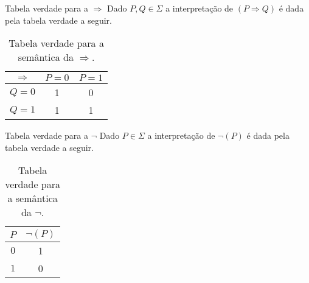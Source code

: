 \documentclass[aspectratio=169]{beamer}
\begin{document}
	\begin{frame}{Tabela verdade para a $\Rightarrow$}
		Dado $P, Q \in \Sigma$ a interpretação de $(P \Rightarrow Q)$ é dada pela tabela verdade a seguir.
		\begin{table}[h]
			\centering
			\begin{tabular}{c|c|c}
				\hline
				$\Rightarrow$ & $P = 0$ & $P = 1$ \\
				\hline
				$Q = 0$ & 1 &  0\\ 
				$Q = 1$ & 1 &  1\\
				\hline
			\end{tabular}
			\caption{Tabela verdade para a semântica da $\Rightarrow$.}
			\label{tab:Implicacao}
		\end{table}
	\end{frame}

	\begin{frame}{Tabela verdade para a $\neg$}
		Dado $P \in \Sigma$ a interpretação de $\neg (P)$ é dada pela tabela verdade a seguir.
		\begin{table}[h]
			\centering
			\begin{tabular}{c|c}
				\hline
				$P$ & $\neg (P)$\\
				\hline
				$0$ & 1\\ 
				$1$ &  0\\
				\hline
			\end{tabular}
			\caption{Tabela verdade para a semântica da $\neg$.}
			\label{tab:negacao}
		\end{table}
	\end{frame}
\end{document}
